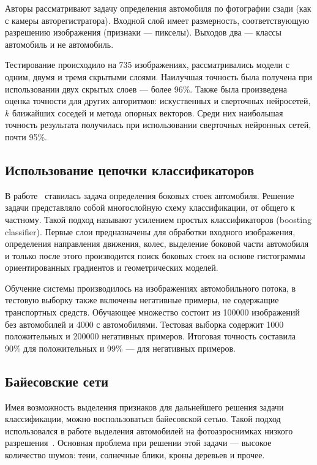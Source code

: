 \documentclass[a4paper,14pt]{extarticle} %
\begin{document}
Авторы рассматривают задачу определения автомобиля по фотографии сзади (как с камеры авторегистратора). Входной слой имеет размерность, соответствующую разрешению изображения (признаки --- пикселы). Выходов два --- классы автомобиль и не автомобиль.

Тестирование происходило на 735 изображениях, рассматривались модели с одним, двумя и тремя скрытыми слоями. Наилучшая точность была получена при использовании двух скрытых слоев --- более 96\%. Также была произведена оценка точности для других алгоритмов: искуственных и сверточных нейросетей, $k$ ближайших соседей и метода опорных векторов. Среди них наибольшая точность результата получилась при использовании сверточных нейронных сетей, почти 95\%.

\subsection{Использование цепочки классификаторов}
\hspace{\parindent} В работе~\cite{brehar2010pillars} ставилась задача определения боковых стоек автомобиля. Решение задачи представляло собой многослойную схему классификации, от общего к частному. Такой подход называют усилением простых классификаторов (boosting classifier). Первые слои предназначены для обработки входного изображения, определения направления движения, колес, выделение боковой части автомобиля и только после этого производится поиск боковых стоек на основе гистограммы ориентированных градиентов и геометрических моделей.

Обучение системы производилось на изображениях автомобильного потока, в тестовую выборку также включены негативные примеры, не содержащие транспортных средств. Обучающее множество состоит из 100000 изображений без автомобилей и 4000 с автомобилями. Тестовая выборка содержит 1000 положительных и 200000 негативных примеров. Итоговая точность составила 90\% для положительных и 99\% --- для негативных примеров.

\subsection{Байесовские сети} 
\hspace{\parindent} Имея возможность выделения признаков для дальнейшего решения задачи классификации, можно воспользоваться байесовской сетью. Такой подход использовался в работе выделения автомобилей на фотоаэроснимках низкого разрешения~\cite{zhao2003car}. Основная проблема при решении этой задачи --- высокое количество шумов: тени, солнечные блики, кроны деревьев и прочее.
\end{document}
